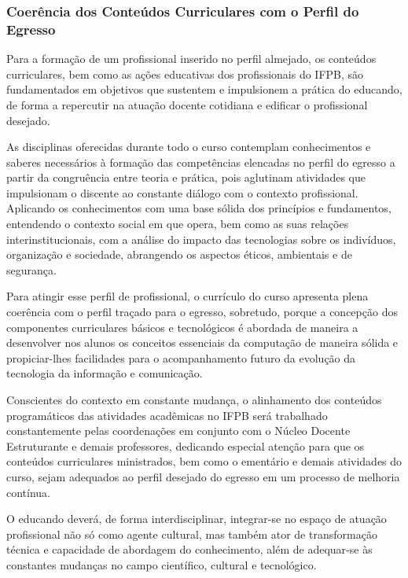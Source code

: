 \subsubsection{Coerência dos Conteúdos Curriculares com o Perfil do Egresso}

Para a formação de um profissional inserido no perfil almejado, os conteúdos curriculares, bem como as ações educativas dos profissionais do IFPB, são fundamentados em objetivos que sustentem e impulsionem a prática do educando, de forma a repercutir na atuação docente cotidiana e edificar o profissional desejado.

As disciplinas oferecidas durante todo o curso contemplam conhecimentos e saberes necessários à formação das competências elencadas no perfil do egresso a partir da congruência entre teoria e prática, pois aglutinam atividades que impulsionam o discente ao constante diálogo com o contexto profissional. Aplicando os conhecimentos com uma base sólida dos princípios e fundamentos, entendendo o contexto social em que opera, bem como as suas relações interinstitucionais, com a análise do impacto das tecnologias sobre os indivíduos, organização e sociedade, abrangendo os aspectos éticos, ambientais e de segurança.

Para atingir esse perfil de profissional, o currículo do curso apresenta plena coerência com o perfil traçado para o egresso, sobretudo, porque a concepção dos componentes curriculares básicos e tecnológicos é abordada de maneira a desenvolver nos alunos os conceitos essenciais da computação de maneira sólida e propiciar-lhes facilidades para o acompanhamento futuro da evolução da tecnologia da informação e comunicação.

Conscientes do contexto em constante mudança, o alinhamento dos conteúdos programáticos das atividades acadêmicas no IFPB será trabalhado constantemente pelas coordenações em conjunto com o Núcleo Docente Estruturante e demais professores, dedicando especial atenção para que os conteúdos curriculares ministrados, bem como o ementário e demais atividades do curso, sejam adequados ao perfil desejado do egresso em um processo de melhoria contínua.

O educando deverá, de forma interdisciplinar, integrar-se no espaço de atuação profissional não só como agente cultural, mas também ator de transformação técnica e capacidade de abordagem do conhecimento, além de adequar-se às constantes mudanças no campo científico, cultural e tecnológico.


